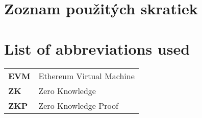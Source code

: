 \thispagestyle{plain}

\ifx\FIITlagEN\undefined
    \section*{\Huge Zoznam použitých skratiek}
\else
    \section*{\Huge List of abbreviations used}
\fi
\vskip 1cm

\begin{tabular}{ >{\bfseries}m{2cm} m{10cm} }
    EVM & Ethereum Virtual Machine \\
    ZK  & Zero Knowledge           \\
    ZKP & Zero Knowledge Proof
\end{tabular}

\begin{tabular}{ >{\bfseries}m{2cm} m{10cm} }
\end{tabular}

\emptypage